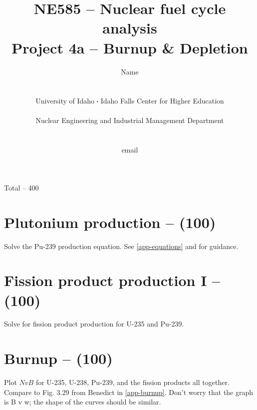 \documentclass[11pt,a4paper]{article}
\newcommand*\sq{\mathbin{\vcenter{\hbox{\rule{.3ex}{.3ex}}}}} %
\begin{document}
\begin{titlepage}
    \title{
        NE585 -- Nuclear fuel cycle analysis\\
        Project 4a -- Burnup \& Depletion\\
    }
    \author{
        Name
        \\ \\ \\
        University of Idaho $\sq$ Idaho Falls Center for Higher Education
        \\ \\
        Nuclear Engineering and Industrial Management Department
        \\ \\ \\
        email 
    }
\clearpage %
\maketitle
\vspace*{\fill}
\begin{flushright}{
        Total -- 400
}
\end{flushright}
\thispagestyle{empty} %
\end{titlepage}


\section{Plutonium production -- (100)}
Solve the Pu-239 production equation. See \cref{app-equations} and  for guidance.





\newpage

\section{Fission product production I -- (100)}
Solve for fission product production for U-235 and Pu-239. 




\newpage

\section{Burnup -- (100)}
Plot $N v B$ for U-235, U-238, Pu-239, and the fission products all together. Compare to Fig. 3.29 from Benedict in \cref{app-burnup}. Don't worry that the graph is B v w; the shape of the curves should be similar. 
\end{document}
